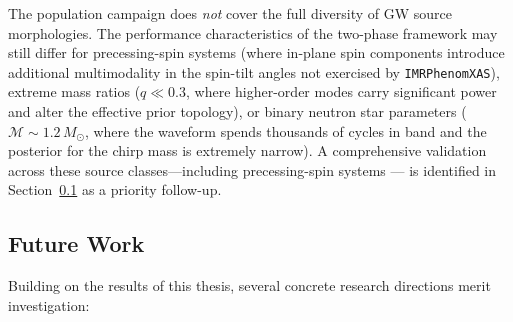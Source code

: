 \documentclass[12pt]{article}
\begin{document}
The population campaign does \emph{not} cover the full diversity of GW source morphologies. The performance characteristics of the two-phase framework may still differ for precessing-spin systems (where in-plane spin components introduce additional multimodality in the spin-tilt angles not exercised by \texttt{IMRPhenomXAS}), extreme mass ratios ($q \ll 0.3$, where higher-order modes carry significant power and alter the effective prior topology), or binary neutron star parameters ($\mathcal{M} \sim 1.2\,M_{\odot}$, where the waveform spends thousands of cycles in band and the posterior for the chirp mass is extremely narrow). A comprehensive validation across these source classes---including precessing-spin systems --- is identified in Section~\ref{sec:future_work} as a priority follow-up.

\subsection{Future Work}
\label{sec:future_work}
Building on the results of this thesis, several concrete research directions merit investigation:
\end{document}
